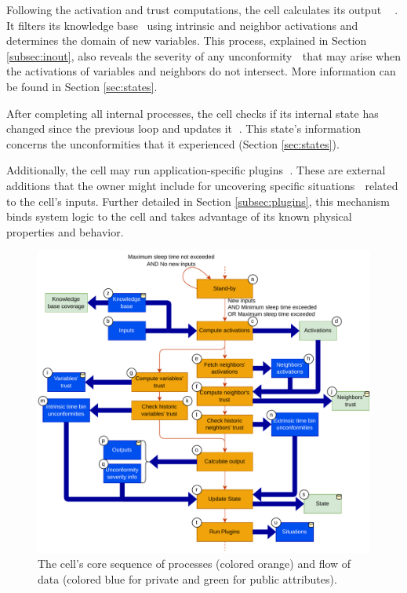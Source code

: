 Following the activation and trust computations, the cell calculates its output \textcircled{} \textcircled{}. It filters its knowledge base \ using intrinsic and neighbor activations and determines the domain of new variables. This process, explained in Section \ref{subsec:inout}, also reveals the severity of any unconformity \textcircled{} that may arise when the activations of variables and neighbors do not intersect. More information can be found in Section \ref{sec:states}.

After completing all internal processes, the cell checks if its internal state has changed since the previous loop and updates it \textcircled{}. This state's information \textcircled{} concerns the unconformities that it experienced (Section \ref{sec:states}).

Additionally, the cell may run application-specific plugins \textcircled{}. These are external additions that the owner might include for uncovering specific situations \textcircled{} related to the cell's inputs. Further detailed in Section \ref{subsec:plugins}, this mechanism binds system logic to the cell and takes advantage of its known physical properties and behavior.

\begin{figure}[h!]
    \centering
    \includegraphics[width=\textwidth]{figures/chapter4/cell/processes.pdf}
    \caption{The cell's core sequence of processes (colored orange) and flow of data (colored blue for private and green for public attributes).}
    \label{fig:cellprocesses}
\end{figure}

